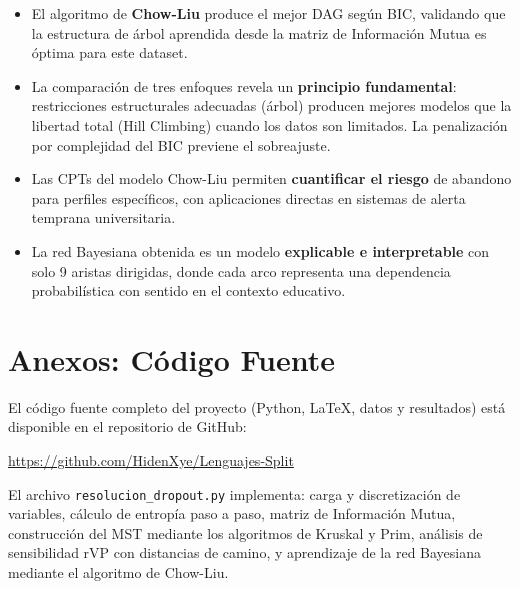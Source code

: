 \documentclass[12pt,a4paper]{article}
\begin{document}
\begin{itemize}
    \item El algoritmo de \textbf{Chow-Liu} produce el mejor DAG según BIC, validando que la estructura de árbol aprendida desde la matriz de Información Mutua es óptima para este dataset.

    \item La comparación de tres enfoques revela un \textbf{principio fundamental}: restricciones estructurales adecuadas (árbol) producen mejores modelos que la libertad total (Hill Climbing) cuando los datos son limitados. La penalización por complejidad del BIC previene el sobreajuste.

    \item Las CPTs del modelo Chow-Liu permiten \textbf{cuantificar el riesgo} de abandono para perfiles específicos, con aplicaciones directas en sistemas de alerta temprana universitaria.

    \item La red Bayesiana obtenida es un modelo \textbf{explicable e interpretable} con solo 9 aristas dirigidas, donde cada arco representa una dependencia probabilística con sentido en el contexto educativo.
\end{itemize}

\newpage
\section{Anexos: Código Fuente}

El código fuente completo del proyecto (Python, LaTeX, datos y resultados) está disponible en el repositorio de GitHub:

\begin{center}
    \url{https://github.com/HidenXye/Lenguajes-Split}
\end{center}

El archivo \texttt{resolucion\_dropout.py} implementa: carga y discretización de variables, cálculo de entropía paso a paso, matriz de Información Mutua, construcción del MST mediante los algoritmos de Kruskal y Prim, análisis de sensibilidad rVP con distancias de camino, y aprendizaje de la red Bayesiana mediante el algoritmo de Chow-Liu.
\end{document}
